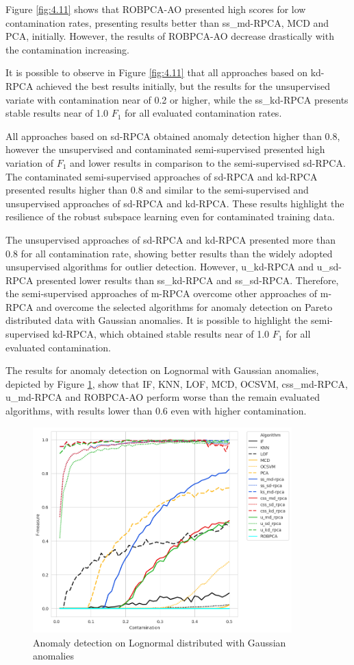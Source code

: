 Figure \ref{fig:4.11} shows that ROBPCA-AO presented high scores for low contamination rates, presenting results better than ss\_md-RPCA, MCD and PCA, initially. However, the results of ROBPCA-AO decrease drastically with the contamination increasing.

It is possible to observe in Figure \ref{fig:4.11} that all approaches based on kd-RPCA achieved the best results initially, but the results for the unsupervised variate with contamination near of 0.2 or higher, while the ss\_kd-RPCA presents stable results near of 1.0 $F_1$ for all evaluated contamination rates.

All approaches based on sd-RPCA obtained anomaly detection higher than 0.8, however the unsupervised and contaminated semi-supervised presented high variation of $F_1$ and lower results in comparison to the semi-supervised sd-RPCA. The contaminated semi-supervised approaches of sd-RPCA and kd-RPCA presented results higher than 0.8 and similar to the semi-supervised and unsupervised approaches of sd-RPCA and kd-RPCA. These results highlight the resilience of the robust subspace learning even for contaminated training data.

The unsupervised approaches of sd-RPCA and kd-RPCA presented more than 0.8 for all contamination rate, showing better results than the widely adopted unsupervised algorithms for outlier detection. However, u\_kd-RPCA and u\_sd-RPCA presented lower results than ss\_kd-RPCA and ss\_sd-RPCA. Therefore, the semi-supervised approaches of m-RPCA overcome other approaches of m-RPCA and overcome the selected algorithms for anomaly detection on Pareto distributed data with Gaussian anomalies. It is possible to highlight the semi-supervised kd-RPCA, which obtained stable results near of 1.0 $F_1$ for all evaluated contamination.

The results for anomaly detection on Lognormal with Gaussian anomalies, depicted by Figure \ref{fig:4.12}, show that IF, KNN, LOF, MCD, OCSVM, css\_md-RPCA, u\_md-RPCA and ROBPCA-AO perform worse than the remain evaluated algorithms, with results lower than 0.6 even with higher contamination. 

\begin{figure}[h!]
	\centering
	\includegraphics[width=10cm]{figs/ch4/lognormal_f1_contamination.png}
	\caption{Anomaly detection on Lognormal distributed with Gaussian anomalies}
	\label{fig:4.12}
\end{figure}

